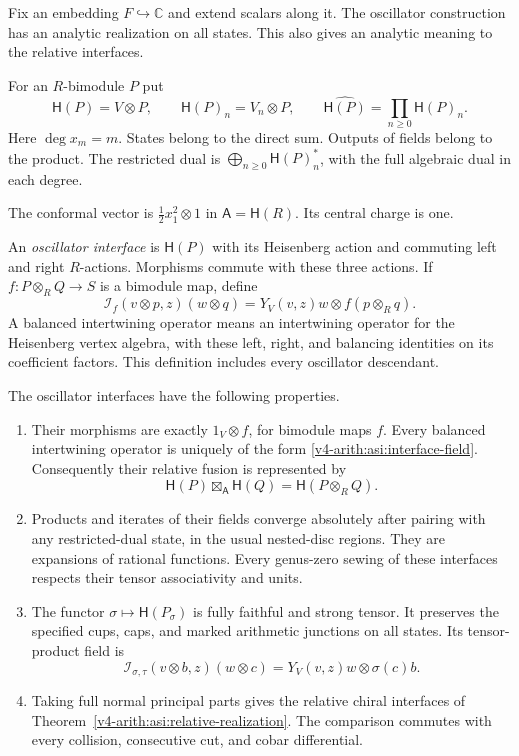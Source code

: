 Fix an embedding $F\hookrightarrow\mathbb C$ and extend scalars along it.
The oscillator construction has an analytic realization on all states.
This also gives an analytic meaning to the relative interfaces.

For an $R$-bimodule $P$ put
\[
 \mathsf H(P)=V\otimes P,\qquad
 \mathsf H(P)_n=V_n\otimes P,\qquad
 \widehat{\mathsf H(P)}=\prod_{n\geq0}\mathsf H(P)_n.
\]
Here $\deg x_m=m$. States belong to the direct sum. Outputs of fields
belong to the product. The restricted dual is
$\bigoplus_{n\geq0}\mathsf H(P)_n^*$, with the full algebraic dual in each
degree.

The conformal vector is $\frac12x_1^2\otimes1$ in
$\mathsf A=\mathsf H(R)$. Its central charge is one.

An \emph{oscillator interface} is $\mathsf H(P)$ with its Heisenberg
action and commuting left and right $R$-actions. Morphisms commute with
these three actions. If $f:P\otimes_RQ\to S$ is a bimodule map, define
\begin{equation}\label{v4-arith:asi:interface-field}
 \mathcal I_f(v\otimes p,z)(w\otimes q)
 =Y_V(v,z)w\otimes f(p\otimes_Rq).
\end{equation}
A balanced intertwining operator means an intertwining operator for the
Heisenberg vertex algebra, with these left, right, and balancing identities
on its coefficient factors. This definition includes every oscillator
descendant.

\begin{theorem}\label{v4-arith:asi:analytic-relative}
The oscillator interfaces have the following properties.
\begin{enumerate}[label=\textup{(\roman*)}]
\item Their morphisms are exactly $1_V\otimes f$, for bimodule maps $f$.
Every balanced intertwining operator is uniquely of the form
\eqref{v4-arith:asi:interface-field}. Consequently their relative fusion is
represented by
\[
 \mathsf H(P)\boxtimes_{\mathsf A}\mathsf H(Q)
 =\mathsf H(P\otimes_RQ).
\]
\item Products and iterates of their fields converge absolutely after
pairing with any restricted-dual state, in the usual nested-disc regions.
They are expansions of rational functions. Every genus-zero sewing of
these interfaces respects their tensor associativity and units.
\item The functor $\sigma\mapsto\mathsf H(P_\sigma)$ is fully faithful
and strong tensor. It preserves the specified cups, caps, and marked
arithmetic junctions on all states. Its tensor-product field is
\begin{equation}\label{v4-arith:asi:full-tensor-field}
 \mathcal I_{\sigma,\tau}(v\otimes b,z)(w\otimes c)
 =Y_V(v,z)w\otimes\sigma(c)b.
\end{equation}
\item Taking full normal principal parts gives the relative chiral
interfaces of Theorem~\ref{v4-arith:asi:relative-realization}. The comparison
commutes with every collision, consecutive cut, and cobar differential.
\end{enumerate}
\end{theorem}

